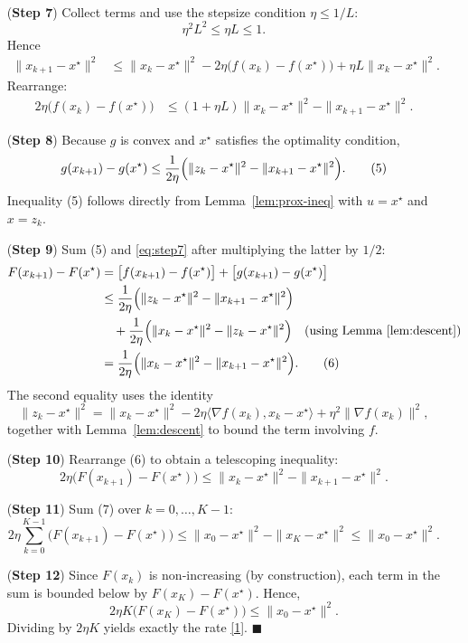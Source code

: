 \documentclass{article}
\newcommand{\grad}{\nabla}
\begin{document}
\begin{enumerate}
\begin{align}
\end{align}
\item[(\textbf{Step 7})] Collect terms and use the stepsize condition $\eta\le 1/L$:
\[
\eta^2 L^2 \le \eta L \le 1 .
\]
Hence
\begin{align}
\|x_{k+1}-x^\star\|^2
&\le \|x_k-x^\star\|^2 -2\eta\bigl(f(x_k)-f(x^\star)\bigr) +\eta L\|x_k-x^\star\|^2 .
\end{align}
Rearrange:
\begin{align}
2\eta\bigl(f(x_k)-f(x^\star)\bigr)
&\le (1+\eta L)\|x_k-x^\star\|^2-\|x_{k+1}-x^\star\|^2 . \label{eq:step7}
\end{align}
\item[(\textbf{Step 8})] Because $g$ is convex and $x^\star$ satisfies the optimality condition,
\[
g(x_{k+1})-g(x^\star)\le \frac{1}{2\eta}\Bigl(\|z_k-x^\star\|^2-\|x_{k+1}-x^\star\|^2\Bigr) .
\tag{5}
\]
Inequality (5) follows directly from Lemma~\ref{lem:prox-ineq} with $u=x^\star$ and $x=z_k$.
\item[(\textbf{Step 9})] Sum (5) and \eqref{eq:step7} after multiplying the latter by $1/2$:
\begin{align}
F(x_{k+1})-F(x^\star)
&= \bigl[f(x_{k+1})-f(x^\star)\bigr]+\bigl[g(x_{k+1})-g(x^\star)\bigr] \nonumber\\
&\le \frac{1}{2\eta}\Bigl(\|z_k-x^\star\|^2-\|x_{k+1}-x^\star\|^2\Bigr) \nonumber\\
&\quad +\frac{1}{2\eta}\Bigl(\|x_k-x^\star\|^2-\|z_k-x^\star\|^2\Bigr) \quad\text{(using Lemma~\ref{lem:descent})} \nonumber\\
&= \frac{1}{2\eta}\Bigl(\|x_k-x^\star\|^2-\|x_{k+1}-x^\star\|^2\Bigr) .
\tag{6}
\end{align}
The second equality uses the identity
\[
\|z_k-x^\star\|^2 = \|x_k-x^\star\|^2 -2\eta\langle\grad f(x_k),x_k-x^\star\rangle +\eta^2\|\grad f(x_k)\|^2,
\]
together with Lemma~\ref{lem:descent} to bound the term involving $f$.
\item[(\textbf{Step 10})] Rearrange (6) to obtain a telescoping inequality:
\[
2\eta\bigl(F(x_{k+1})-F(x^\star)\bigr) \le \|x_k-x^\star\|^2-\|x_{k+1}-x^\star\|^2 .
\tag{7}
\]
\item[(\textbf{Step 11})] Sum (7) over $k=0,\dots, K-1$:
\[
2\eta\sum_{k=0}^{K-1}\bigl(F(x_{k+1})-F(x^\star)\bigr)
\le \|x_0-x^\star\|^2-\|x_{K}-x^\star\|^2
\le \|x_0-x^\star\|^2 .
\tag{8}
\]
\item[(\textbf{Step 12})] Since $F(x_{k})$ is non‑increasing (by construction), each term in the sum is bounded below by $F(x_{K})-F(x^\star)$. Hence,
\[
2\eta K\bigl(F(x_{K})-F(x^\star)\bigr) \le \|x_0-x^\star\|^2 .
\]
Dividing by $2\eta K$ yields exactly the rate \eqref{1}. \hfill$\blacksquare$
\end{enumerate}
\end{document}
